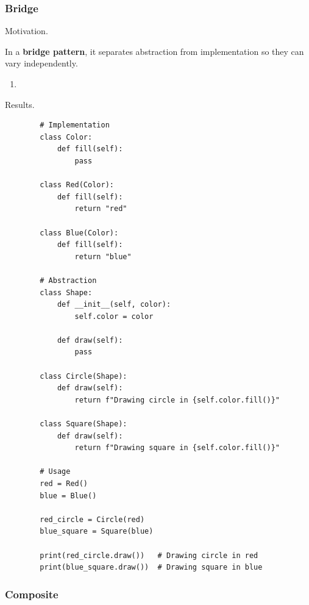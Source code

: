   \subsubsection{Bridge}

    Motivation. 

    \begin{definition}
      \label{def:bridge-pattern}
      In a \textbf{bridge pattern}, it separates abstraction from implementation so they can vary independently. 
      \begin{enumerate}
        \item 
      \end{enumerate}
    \end{definition}

    Results. 

    \begin{example}
      \label{ex:case-study-3}
      \begin{lstlisting}
        # Implementation
        class Color:
            def fill(self):
                pass

        class Red(Color):
            def fill(self):
                return "red"

        class Blue(Color):
            def fill(self):
                return "blue"

        # Abstraction
        class Shape:
            def __init__(self, color):
                self.color = color
            
            def draw(self):
                pass

        class Circle(Shape):
            def draw(self):
                return f"Drawing circle in {self.color.fill()}"

        class Square(Shape):
            def draw(self):
                return f"Drawing square in {self.color.fill()}"

        # Usage
        red = Red()
        blue = Blue()

        red_circle = Circle(red)
        blue_square = Square(blue)

        print(red_circle.draw())   # Drawing circle in red
        print(blue_square.draw())  # Drawing square in blue
      \end{lstlisting}
    \end{example}

  \subsubsection{Composite}

